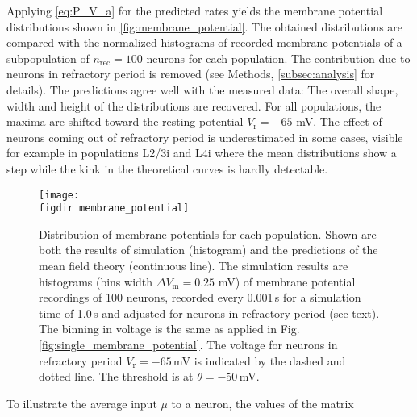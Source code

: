 Applying \autoref{eq:P_V_a} for the predicted rates yields the 
membrane potential distributions shown in 
\autoref{fig:membrane_potential}. 
The obtained distributions are compared with the normalized histograms of recorded 
membrane potentials of a subpopulation of $n_\text{rec} = 100$ neurons for 
each population. The contribution due to neurons in refractory period is removed
(see Methods, \autoref{subsec:analysis} for details). 
The predictions agree well with the measured data: The overall shape, width and 
height of the distributions are recovered. For all populations, the maxima are
shifted toward the resting potential $V_\text{r} = -65$ mV. 
The effect
of neurons coming out of refractory period is underestimated in some cases, 
visible for example in populations L2/3i and L4i where the mean distributions 
show a step while the kink in the theoretical curves is hardly detectable. 

\begin{figure}[tb]
    \centering
    \texttt{[image: \\figdir membrane\_potential]}
    \caption[Distribution of membrane potentials]{
        Distribution of membrane potentials for each population. 
        Shown are both the results of simulation (histogram) and 
        the predictions of the mean field theory (continuous line). 
        The simulation results are histograms (bins width $\Delta V_\text{m} = 0.25$ mV) 
        of membrane potential recordings 
        of 100 neurons, recorded every 0.001\,s for a simulation time of 1.0\,s 
        and adjusted for neurons in refractory period (see text). 
        The binning in voltage is the same as applied in Fig.~%
        \autoref{fig:single_membrane_potential}. 
        The voltage for neurons in refractory period $V_\text{r} = -65$\,mV 
        is indicated by the dashed and dotted line. The threshold is at 
        $\theta = -50$\,mV. 
    }
    \label{fig:membrane_potential}
\end{figure}

To illustrate the average input $\mu$ to a neuron, the values of the matrix $$ 

